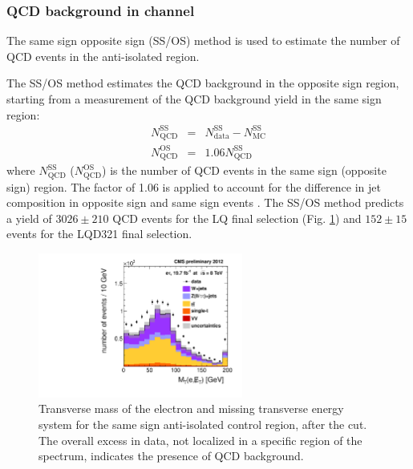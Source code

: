 \subsubsection{QCD background in \etau channel}
\label{sec:qcdbkg}

The same sign opposite sign (SS/OS) method is used to estimate the number of QCD events in the anti-isolated region. 

The SS/OS method estimates the QCD background in the opposite sign region, starting from a measurement of the QCD background yield in the same sign region:
\begin{eqnarray}
N_{\text{QCD}}^{\text{SS}} & = & N_{\text{data}}^{\text{SS}} - N_{\text{MC}}^{\text{SS}} \label{bkg:QCDss}\\
N_{\text{QCD}}^{\text{OS}} & = & 1.06 N_{\text{QCD}}^{\text{SS}} \label{bkg:QCDos}
\end{eqnarray}
where $N_{\text{QCD}}^{\text{SS}}$ ($N_{\text{QCD}}^{\text{OS}}$) is the number of QCD events in the same sign (opposite sign) region. The factor of 1.06 is applied to account for the difference in jet composition in opposite sign and same sign events \cite{AN-13-178}.
The SS/OS method predicts a yield of $3026 \pm 210$ QCD events for the LQ final selection (Fig. \ref{fig:QCDSSAiso}) and $152 \pm 15$ events for the LQD321 final selection.


\begin{figure}[htbp]
  \begin{center}
    \includegraphics[width=0.6\textwidth]{figures/etau/eMETTMassSSAIsoFinal.pdf}
    \caption{Transverse mass of the electron and missing transverse energy system for the same sign anti-isolated control region, after the \MassTJ cut. The overall excess in data, not localized in a specific region of the spectrum, indicates the presence of QCD background.}
    \label{fig:QCDSSAiso}
  \end{center}
\end{figure}

